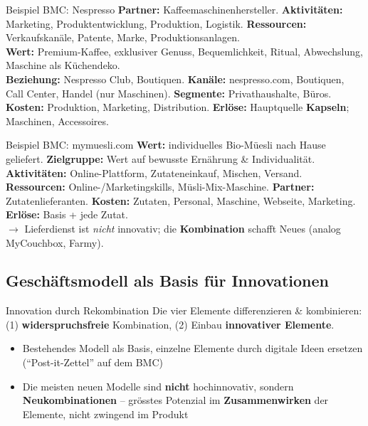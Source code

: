 \documentclass[a4paper, fontsize=7pt]{scrartcl}
\begin{document}
\begin{subbox}{Beispiel BMC: Nespresso}
\textbf{Partner:} Kaffeemaschinenhersteller. \textbf{Aktivitäten:}
Marketing, Produktentwicklung, Produktion, Logistik. \textbf{Ressourcen:}
Verkaufskanäle, Patente, Marke, Produktionsanlagen.\\
\textbf{Wert:} Premium-Kaffee, exklusiver Genuss, Bequemlichkeit, Ritual,
Abwechslung, Maschine als Küchendeko.\\
\textbf{Beziehung:} Nespresso Club, Boutiquen. \textbf{Kanäle:}
nespresso.com, Boutiquen, Call Center, Handel (nur Maschinen).
\textbf{Segmente:} Privathaushalte, Büros.\\
\textbf{Kosten:} Produktion, Marketing, Distribution.
\textbf{Erlöse:} Hauptquelle \textbf{Kapseln}; Maschinen, Accessoires.
\end{subbox}

\begin{subbox}{Beispiel BMC: mymuesli.com}
\textbf{Wert:} individuelles Bio-Müesli nach Hause geliefert.
\textbf{Zielgruppe:} Wert auf bewusste Ernährung \& Individualität.
\textbf{Aktivitäten:} Online-Plattform, Zutateneinkauf, Mischen, Versand.
\textbf{Ressourcen:} Online-/Marketingskills, Müsli-Mix-Maschine.
\textbf{Partner:} Zutatenlieferanten. \textbf{Kosten:} Zutaten, Personal,
Maschine, Webseite, Marketing. \textbf{Erlöse:} Basis + jede Zutat.\\
$\to$ Lieferdienst ist \emph{nicht} innovativ; die \textbf{Kombination}
schafft Neues (analog MyCouchbox, Farmy).
\end{subbox}

\subsection{Geschäftsmodell als Basis für Innovationen}

\begin{mainbox}{Innovation durch Rekombination}
Die vier Elemente differenzieren \& kombinieren:
(1) \textbf{widerspruchsfreie} Kombination, (2) Einbau
\textbf{innovativer Elemente}.
\begin{itemize}
    \item Bestehendes Modell als Basis, einzelne Elemente durch digitale
    Ideen ersetzen (``Post-it-Zettel'' auf dem BMC)
    \item Die meisten neuen Modelle sind \textbf{nicht} hochinnovativ, sondern
    \textbf{Neukombinationen} -- grösstes Potenzial im
    \textbf{Zusammenwirken} der Elemente, nicht zwingend im Produkt
\end{itemize}
\end{mainbox}
\end{document}
